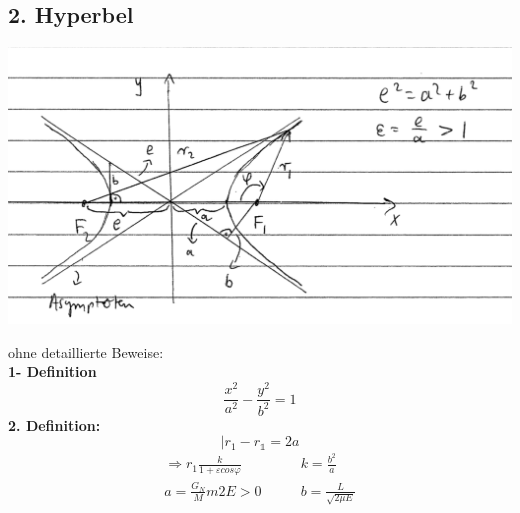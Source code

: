 \documentclass[11pt]{article}
\begin{document}
	\subsection{2. Hyperbel}
	\begin{center}
		\includegraphics[scale=0.5]{Hyperbelproblem.png}
	\end{center}
ohne detaillierte Beweise:\\
\textbf{1- Definition}\\
\[ \frac{x^2}{a^2} - \frac{y^2}{b^2} = 1 \]
\textbf{2. Definition:}\\
\[ |r_1 - r_\mathds{1} = 2a \]
\begin{align*}
	\Rightarrow r_1 \frac{k}{1 + \varepsilon cos \varphi} &\qquad k = \frac{b^2}{a}\\
	a= \frac{G_N}Mm{2E} > 0&\qquad b = \frac{L}{\sqrt{2\mu E}} 
\end{align*}
\end{document}
